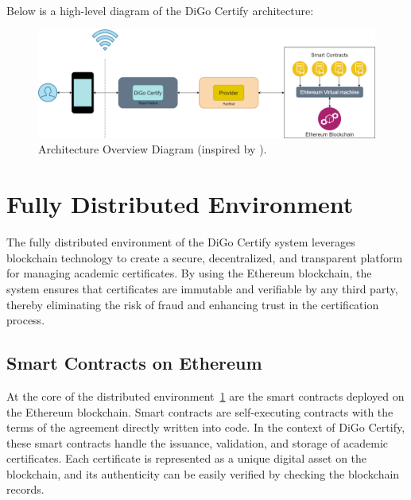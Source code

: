 \paragraph{}
Below is a high-level diagram of the DiGo Certify architecture:

\begin{figure}[H]
    \centering
    \includegraphics[width=1\textwidth]{../diagrams/architecture-overview.drawio.png}
    \caption{Architecture Overview Diagram (inspired by \cite{geeksforgeeks-dApps}).}
    \label{fig:architecture-overview}
\end{figure}

\section{Fully Distributed Environment}\label{sec:fully-distributed-environment}

The fully distributed environment of the DiGo Certify system leverages blockchain technology to create a secure, decentralized, and transparent platform for managing academic certificates. By using the Ethereum blockchain, the system ensures that certificates are immutable and verifiable by any third party, thereby eliminating the risk of fraud and enhancing trust in the certification process.

\subsection{Smart Contracts on Ethereum}

At the core of the distributed environment~\ref{fig:architecture-overview} are the smart contracts deployed on the Ethereum blockchain. Smart contracts are self-executing contracts with the terms of the agreement directly written into code. In the context of DiGo Certify, these smart contracts handle the issuance, validation, and storage of academic certificates. Each certificate is represented as a unique digital asset on the blockchain, and its authenticity can be easily verified by checking the blockchain records.

